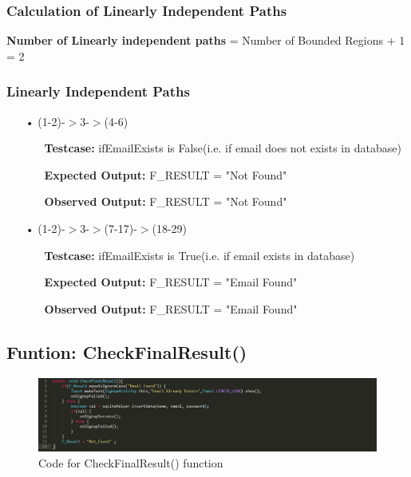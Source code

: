 \documentclass{scrreprt}
\begin{document}
\newpage


\subsubsection{Calculation of Linearly Independent Paths}
\textbf{Number of Linearly independent paths} = Number of Bounded Regions + 1 = 2
\subsubsection{Linearly Independent Paths}
\begin{enumerate}
\item[•](1-2)-$>$3-$>$(4-6)
\begin{itemize}
\item[]\textbf{Testcase: }ifEmailExists is False(i.e. if email does not exists in database)
\item[]\textbf{Expected Output: }F_RESULT = "Not Found"
\item[]\textbf{Observed Output: }F_RESULT = "Not Found"
\end{itemize}

\item[•](1-2)-$>$3-$>$(7-17)-$>$(18-29)
\begin{itemize}
\item[]\textbf{Testcase: }ifEmailExists is True(i.e. if email exists in database)
\item[]\textbf{Expected Output: }F_RESULT = "Email Found"
\item[]\textbf{Observed Output: }F_RESULT = "Email Found"
\end{itemize}

\end{enumerate}

\subsection{Funtion: CheckFinalResult()}
\begin{figure}[H]
\centering
\includegraphics[width=\textwidth, keepaspectratio]{checkFinalResultCode.png}
\caption{Code for CheckFinalResult() function}
\end{figure}
\end{document}
